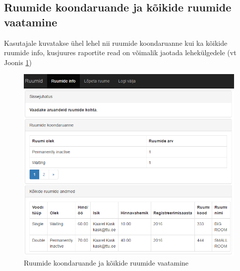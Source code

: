 \documentclass[a4paper,12pt]{article} %
\begin{document}
\subsection{Ruumide koondaruande ja kõikide ruumide vaatamine}
Kasutajale kuvatakse ühel lehel nii ruumide koondaruanne kui ka kõikide ruumide info, kusjuures raportite read on võimalik jaotada lehekülgedele (vt Joonis \ref{fig_näidisrakendus_raportid})
\begin{figure}[H]
\begin{center}
\includegraphics[bb=0 0 732 630,scale=0.8]{./diagrams/sample-app-reports.png}
\caption{Ruumide koondaruande ja kõikide ruumide vaatamine}
\label{fig_näidisrakendus_raportid}
\end{center}
\end{figure}
\end{document}
